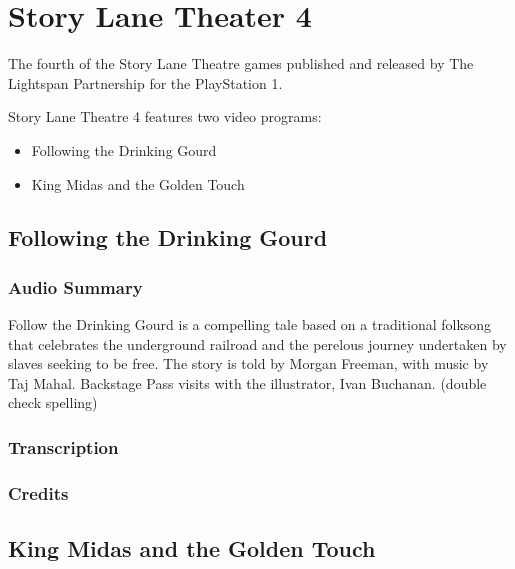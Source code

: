 \chapter{Story Lane Theater 4}


The fourth of the Story Lane Theatre games published and released by The Lightspan Partnership for the PlayStation 1.

Story Lane Theatre 4 features two video programs:

\begin{itemize}
    \item Following the Drinking Gourd
    \item King Midas and the Golden Touch
\end{itemize}

\clearpage
\newpage

\section{Following the Drinking Gourd}

\subsection{Audio Summary}

Follow the Drinking Gourd is a compelling tale based on a traditional folksong that celebrates the underground railroad and the perelous journey undertaken by slaves seeking to be free. The story is told by Morgan Freeman, with music by Taj Mahal. Backstage Pass visits with the illustrator, Ivan Buchanan. (double check spelling)

\subsection{Transcription}

\subsection{Credits}

\section{King Midas and the Golden Touch}

